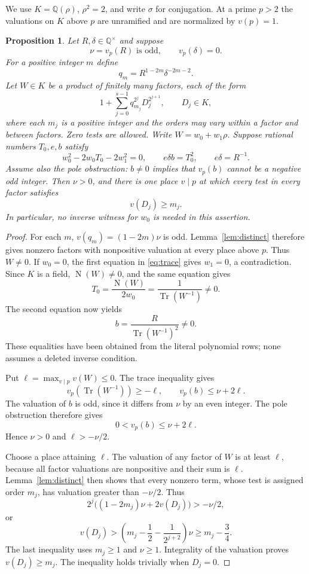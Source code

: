 \documentclass[11pt,a4paper]{article}
\newtheorem{proposition}[theorem]{Proposition}
\theoremstyle{remark}\newtheorem{remark}[theorem]{Remark}
\newcommand{\Q}{\mathbb Q}\newcommand{\Z}{\mathbb Z}
\DeclareMathOperator{\Tr}{Tr}\DeclareMathOperator{\Nm}{N}
\begin{document}
We use $K=\Q(\rho)$, $\rho^2=2$, and write $\sigma$ for conjugation.
At a prime $p>2$ the valuations on $K$ above $p$ are unramified and
are normalized by $v(p)=1$.

\begin{proposition}\label{prop:general}
Let $R,\delta\in\Q^\times$ and suppose
\[
 \nu=v_p(R)\text{ is odd},\qquad v_p(\delta)=0.
\]
For a positive integer $m$ define
\[
 q_m=R^{1-2m}\delta^{-2m-2}.
\]
Let $W\in K$ be a product of finitely many factors, each of the form
\[
 1+\sum_{j=0}^{s-1}q_{m_j}^{2^j}D_j^{2^{j+1}},\qquad D_j\in K,
\]
where each $m_j$ is a positive integer and the orders may vary
within a factor and between factors. Zero tests are allowed. Write
$W=w_0+w_1\rho$. Suppose rational numbers $T_0,e,b$ satisfy
\begin{equation}\label{eq:trace}
 w_0^2-2w_0T_0-2w_1^2=0,\qquad e\delta b=T_0^2,
 \qquad e\delta=R^{-1}.
\end{equation}
Assume also the pole obstruction: $b\ne0$ implies that $v_p(b)$
cannot be a negative odd integer. Then $\nu>0$, and there is one place
$v\mid p$ at which every test in every factor satisfies
\[
                            v(D_j)\ge m_j.
\]
In particular, no inverse witness for $w_0$ is needed in this assertion.
\end{proposition}
\begin{proof}
For each $m$, $v(q_m)=(1-2m)\nu$ is odd. Lemma~\ref{lem:distinct}
therefore gives nonzero factors with nonpositive valuation at every
place above $p$. Thus $W\ne0$. If $w_0=0$, the first equation in
\eqref{eq:trace} gives $w_1=0$, a contradiction. Since $K$ is a field,
$\Nm(W)\ne0$, and the same equation gives
\[
 T_0=\frac{\Nm(W)}{2w_0}
     =\frac1{\Tr(W^{-1})}\ne0.
\]
The second equation now yields
\[
                        b=\frac{R}{\Tr(W^{-1})^2}\ne0.
\]
These equalities have been obtained from the literal polynomial rows;
none assumes a deleted inverse condition.

Put $\ell=\max_{v\mid p}v(W)\le0$. The trace inequality gives
\[
 v_p(\Tr(W^{-1}))\ge-\ell,
 \qquad v_p(b)\le\nu+2\ell.
\]
The valuation of $b$ is odd, since it differs from $\nu$ by an even
integer. The pole obstruction therefore gives
\begin{equation}\label{eq:positive}
                         0<v_p(b)\le\nu+2\ell.
\end{equation}
Hence $\nu>0$ and $\ell>-\nu/2$.

Choose a place attaining $\ell$. The valuation of any factor of $W$
is at least $\ell$, because all factor valuations are nonpositive
and their sum is $\ell$. Lemma~\ref{lem:distinct} then shows that
every nonzero term, whose test is assigned order $m_j$, has valuation
greater than $-\nu/2$. Thus
\[
 2^j\bigl((1-2m_j)\nu+2v(D_j)\bigr)>-\nu/2,
\]
or
\[
 v(D_j)>\left(m_j-\frac12-\frac1{2^{j+2}}\right)\nu
       \ge m_j-\frac34.
\]
The last inequality uses $m_j\ge1$ and $\nu\ge1$. Integrality of the
valuation proves $v(D_j)\ge m_j$. The inequality holds trivially when
$D_j=0$.
\end{proof}
\end{document}
